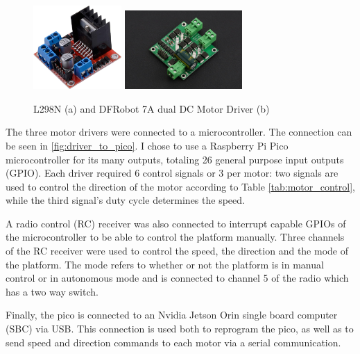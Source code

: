 \documentclass[11pt]{article}
\begin{document}
            
            \begin{figure}[h]
                \centering
                \includegraphics[width=0.3\textwidth]{Images/olddrivers.jpg}
                \includegraphics[width=0.4\textwidth]{Images/newdrivers.jpg}
                \caption{L298N (a) and DFRobot 7A dual DC Motor Driver (b)}
                \label{fig:drivers_comparison}
            \end{figure}

            The three motor drivers were connected to a microcontroller. The connection can be seen in \ref{fig:driver_to_pico}.
            I chose to use a Raspberry Pi Pico microcontroller for its many outputs, totaling 26 general purpose input outputs (GPIO). Each driver required 6 control signals or 3 per motor: two signals are used to control the direction of the motor according to Table \ref{tab:motor_control}, while the third signal's duty cycle determines the speed.

            A radio control (RC) receiver was also connected to interrupt capable GPIOs of the microcontroller to be able to control the platform manually. Three channels of the RC receiver were used to control the speed, the direction and the mode of the platform. The mode refers to whether or not the platform is in manual control or in autonomous mode and is connected to channel 5 of the radio which has a two way switch.

            Finally, the pico is connected to an Nvidia Jetson Orin single board computer (SBC) via USB. This connection is used both to reprogram the pico, as well as to send speed and direction commands to each motor via a serial communication. 
\end{document}
